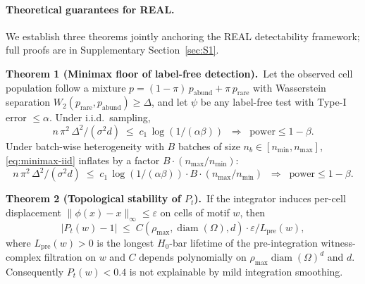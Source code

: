 
\paragraph{Theoretical guarantees for REAL.}
We establish three theorems jointly anchoring the REAL detectability framework; full proofs are in Supplementary Section~\ref{sec:S1}.

\medskip\noindent\textbf{Theorem 1 (Minimax floor of label-free detection).}\
Let the observed cell population follow a mixture $p = (1-\pi)\,p_{\mathrm{abund}} + \pi\,p_{\mathrm{rare}}$ with Wasserstein separation $W_2(p_{\mathrm{rare}}, p_{\mathrm{abund}}) \geq \Delta$, and let $\psi$ be any label-free test with Type-I error $\leq \alpha$. Under i.i.d.\ sampling,
\begin{equation}
  n\,\pi^{2}\,\Delta^{2}/(\sigma^{2} d)
  \;\leq\; c_{1}\,\log(1/(\alpha\beta))
  \;\;\Longrightarrow\;\;
  \text{power} \leq 1-\beta.
  \label{eq:minimax-iid}
\end{equation}
Under batch-wise heterogeneity with $B$ batches of size $n_b\in[n_{\min}, n_{\max}]$, \eqref{eq:minimax-iid} inflates by a factor $B\cdot(n_{\max}/n_{\min})$:
\begin{equation}
  n\,\pi^{2}\,\Delta^{2}/(\sigma^{2} d)
  \;\leq\; c_{1}\,\log(1/(\alpha\beta))\cdot B\cdot(n_{\max}/n_{\min})
  \;\;\Longrightarrow\;\;
  \text{power} \leq 1-\beta.
  \label{eq:minimax-hetero}
\end{equation}

\medskip\noindent\textbf{Theorem 2 (Topological stability of $P_t$).}\
If the integrator induces per-cell displacement $\|\phi(x)-x\|_{\infty}\leq \varepsilon$ on cells of motif $w$, then
\begin{equation}
  |P_{t}(w)-1|
  \;\leq\; C(\rho_{\max},\operatorname{diam}(\Omega),d)\cdot \varepsilon / L_{\mathrm{pre}}(w),
\end{equation}
where $L_{\mathrm{pre}}(w)>0$ is the longest $H_{0}$-bar lifetime of the pre-integration witness-complex filtration on $w$ and $C$ depends polynomially on $\rho_{\max}\operatorname{diam}(\Omega)^{d}$ and $d$. Consequently $P_{t}(w)<0.4$ is not explainable by mild integration smoothing.

